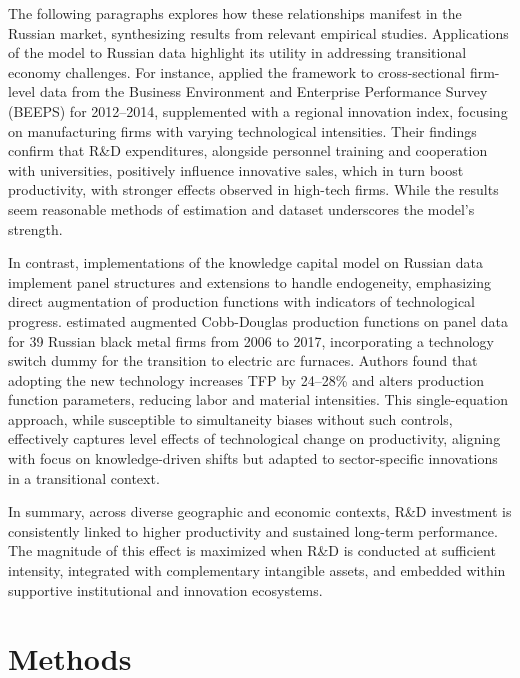 \documentclass[a4paper, 12pt]{article}
\begin{document}
The following paragraphs explores how these relationships manifest in the Russian market, synthesizing results from relevant empirical studies. Applications of the \textcite{crepon1998research} model to Russian data highlight its utility in addressing transitional economy challenges. For instance, \textcite{mariev2022effects} applied the \textcite{crepon1998research} framework to cross-sectional firm-level data from the Business Environment and Enterprise Performance Survey (BEEPS) for 2012–2014, supplemented with a regional innovation index, focusing on manufacturing firms with varying technological intensities. Their findings confirm that R\&D expenditures, alongside personnel training and cooperation with universities, positively influence innovative sales, which in turn boost productivity, with stronger effects observed in high-tech firms. While the results seem reasonable methods of estimation and dataset underscores the \textcite{crepon1998research} model's strength. 

In contrast, implementations of the \textcite{griliches1979issues} knowledge capital model on Russian data implement panel structures and extensions to handle endogeneity, emphasizing direct augmentation of production functions with indicators of technological progress. \textcite{malein2019total} estimated augmented Cobb-Douglas production functions on panel data for 39 Russian black metal firms from 2006 to 2017, incorporating a technology switch dummy for the transition to electric arc furnaces. Authors found that adopting the new technology increases TFP by 24–28\% and alters production function parameters, reducing labor and material intensities. This single-equation approach, while susceptible to simultaneity biases without such controls, effectively captures level effects of technological change on productivity, aligning with \textcite{griliches1979issues} focus on knowledge-driven shifts but adapted to sector-specific innovations in a transitional context.

In summary, across diverse geographic and economic contexts, R\&D investment is consistently linked to higher productivity and sustained long-term performance. The magnitude of this effect is maximized when R\&D is conducted at sufficient intensity, integrated with complementary intangible assets, and embedded within supportive institutional and innovation ecosystems.



\section{Methods}
\end{document}
